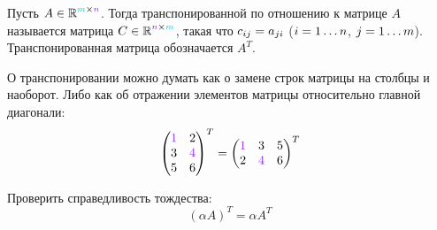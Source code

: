 \documentclass[a4paper,12pt]{article}
\begin{document}
  \begin{definition}
    Пусть $A \hm\in \RR^{\textcolor{light-cyan}{m} \times \textcolor{light-purple}{n}}$.
    Тогда транспонированной по отношению к матрице $A$ называется матрица $C \hm\in \RR^{\textcolor{light-purple}{n} \times \textcolor{light-cyan}{m}}$, такая что $c_{ij} \hm= a_{ji}$ ($i \hm= 1 \ldots n$, $j \hm= 1 \ldots m$).
    Транспонированная матрица обозначается $A^T$.
  \end{definition}
  
  \begin{example}
    О транспонировании можно думать как о замене строк матрицы на столбцы и наоборот.
    Либо как об отражении элементов матрицы относительно главной диагонали:
    \[
      \begin{pmatrix}
        \textcolor{light-purple}{1} & 2\\
        3                           & \textcolor{light-purple}{4}\\
        5                           & 6
      \end{pmatrix}^T
      = \begin{pmatrix}
        \textcolor{light-purple}{1} & 3                           & 5\\
        2                           & \textcolor{light-purple}{4} & 6
      \end{pmatrix}^T
    \]
  \end{example}
  
  \begin{problem}[15.13(1)]
    Проверить справедливость тождества:
    \[
      (\alpha A)^T = \alpha A^T
    \]
  \end{problem}
  
\end{document}
